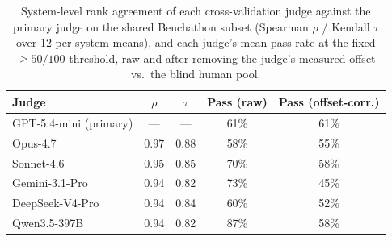 \begin{table}[t]
\centering\footnotesize
\caption{System-level rank agreement of each cross-validation judge against the primary judge on the shared Benchathon subset (Spearman $\rho$ / Kendall $\tau$ over 12 per-system means), and each judge's mean pass rate at the fixed $\geq 50/100$ threshold, raw and after removing the judge's measured offset vs.\ the blind human pool.}
\label{tbl-judge-swap-agreement}
\setlength{\tabcolsep}{4pt}
\begin{tabular*}{\textwidth}{@{\extracolsep{\fill}}lcccc@{}}
\toprule
Judge & $\rho$ & $\tau$ & Pass (raw) & Pass (offset-corr.) \\
\midrule
GPT-5.4-mini (primary) & — & — & 61\% & 61\% \\
Opus-4.7 & 0.97 & 0.88 & 58\% & 55\% \\
Sonnet-4.6 & 0.95 & 0.85 & 70\% & 58\% \\
Gemini-3.1-Pro & 0.94 & 0.82 & 73\% & 45\% \\
DeepSeek-V4-Pro & 0.94 & 0.84 & 60\% & 52\% \\
Qwen3.5-397B & 0.94 & 0.82 & 87\% & 58\% \\
\bottomrule
\end{tabular*}
\end{table}
